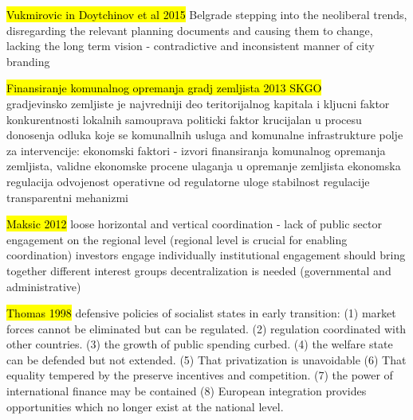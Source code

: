 \documentclass[11pt]{report}
\begin{document}
	\hl{Vukmirovic in Doytchinov et al 2015}
Belgrade stepping into the neoliberal trends, disregarding the relevant planning documents and causing them to change, lacking the long term vision - contradictive and inconsistent manner of  city branding

\hl{Finansiranje komunalnog opremanja gradj zemljista 2013 SKGO}\\
gradjevinsko zemljiste je najvredniji deo teritorijalnog kapitala i kljucni faktor konkurentnosti lokalnih samouprava
politicki faktor krucijalan u procesu donosenja odluka koje se komunallnih usluga and komunalne infrastrukture
polje za intervencije: ekonomski faktori  - izvori finansiranja komunalnog opremanja zemljista, validne ekonomske procene ulaganja u opremanje zemljista
ekonomska regulacija
    odvojenost operativne od regulatorne uloge
    stabilnost regulacije
    transparentni mehanizmi
    
\hl{Maksic 2012}
    loose horizontal and vertical coordination - lack of public sector engagement on the regional level (regional level is crucial for enabling coordination)
    investors engage individually
    institutional engagement should bring together different interest groups
    decentralization is needed (governmental and administrative)
    
\hl{Thomas 1998}
defensive policies of socialist states in early transition:
(1) market  forces  cannot  be  eliminated  but  can  be  regulated.
(2) regulation coordinated  with  other  countries.
(3) the growth  of public  spending curbed.
(4) the welfare  state can be defended  but  not  extended.
(5)  That  privatization  is  unavoidable
(6)  That  equality tempered  by  the  preserve incentives  and  competition.
(7) the  power  of  international  finance  may  be  contained
(8) European  integration  provides  opportunities  which  no longer  exist  at the national  level.
\end{document}
